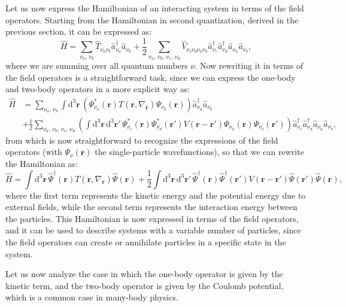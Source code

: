 Let us now express the Hamiltonian of an interacting system in terms of the field operators. Starting from the Hamiltonian in second quantization, derived in the previous section, it can be expressed as:
\[
    \hat{H} = \sum_{\nu_a,\,\nu_b} \hat{T}_{\nu_a \nu_b} \hat{a}_{\nu_a}^\dagger \hat{a}_{\nu_b} + \frac{1}{2} \sum_{\nu_a,\,\nu_b,\,\nu_c,\,\nu_d} \hat{V}_{\nu_c \nu_d \nu_a \nu_b} \hat{a}_{\nu_c}^\dagger \hat{a}_{\nu_d}^\dagger \hat{a}_{\nu_a} \hat{a}_{\nu_b},
\]
where we are summing over all quantum numbers $\nu$. Now rewriting it in terms of the field operators is a straightforward task, since we can express the one-body and two-body operators in a more explicit way as:
\[
    \begin{aligned}
        \hat{H} & = \sum_{\nu_a,\,\nu_b} \int \mathrm{d}^3 \mathbf{r} \, \left( \Psi_{\nu_a}^*(\mathbf{r}) T (\mathbf{r}, \nabla_{\mathbf{r}}) \Psi_{\nu_b}(\mathbf{r}) \right) \hat{a}_{\nu_a}^\dagger \hat{a}_{\nu_b}                                                                                                                                                \\
                & + \frac{1}{2} \sum_{\nu_a,\,\nu_b,\,\nu_c,\,\nu_d} \left( \int \mathrm{d}^3 \mathbf{r} \, \mathrm{d}^3 \mathbf{r}' \, \Psi_{\nu_c}^*(\mathbf{r}) \Psi_{\nu_d}^*(\mathbf{r}') V(\mathbf{r} - \mathbf{r}') \Psi_{\nu_a}(\mathbf{r}) \Psi_{\nu_b}(\mathbf{r}') \right) \hat{a}_{\nu_c}^\dagger \hat{a}_{\nu_d}^\dagger \hat{a}_{\nu_a} \hat{a}_{\nu_b},
    \end{aligned}
\]
from which is now straightforward to recognize the expressions of the field operators (with \(\Psi_{\nu}(\mathbf{r})\) the single-particle wavefunctions), so that we can rewrite the Hamiltonian as:
\[
    \hat{H} = \int \mathrm{d}^3 \mathbf{r} \, \hat{\Psi}^\dagger(\mathbf{r}) T (\mathbf{r}, \nabla_{\mathbf{r}}) \hat{\Psi}(\mathbf{r}) + \frac{1}{2} \int \mathrm{d}^3 \mathbf{r} \, \mathrm{d}^3 \mathbf{r}' \, \hat{\Psi}^\dagger(\mathbf{r}) \hat{\Psi}^\dagger(\mathbf{r}') V(\mathbf{r} - \mathbf{r}') \hat{\Psi}(\mathbf{r}') \hat{\Psi}(\mathbf{r}),
\]
where the first term represents the kinetic energy and the potential energy due to external fields, while the second term represents the interaction energy between the particles. This Hamiltonian is now expressed in terms of the field operators, and it can be used to describe systems with a variable number of particles, since the field operators can create or annihilate particles in a specific state in the system.

Let us now analyze the case in which the one-body operator is given by the kinetic term, and the two-body operator is given by the Coulomb potential, which is a common case in many-body physics.

